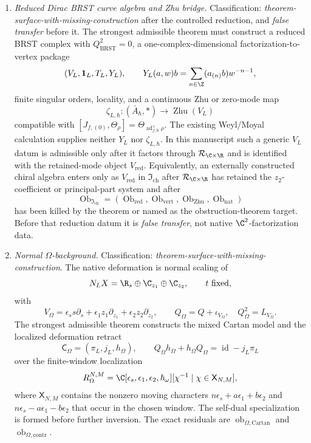 \begin{enumerate}
  \item \emph{Reduced Dirac BRST curve algebra and Zhu bridge.}
  Classification: \emph{theorem-surface-with-missing-construction} after
  the controlled reduction, and \emph{false transfer} before it.  The
  strongest admissible theorem must construct a reduced BRST complex
  with \(Q_{\mathrm{BRST}}^2=0\), a one-complex-dimensional
  factorization-to-vertex package
  \[
    (V_L,\mathbf 1_L,T_L,Y_L),
    \qquad
    Y_L(a,w)b=\sum_{n\in\Z}(a_{(n)}b)w^{-n-1},
  \]
  finite singular orders, locality, and a continuous Zhu or zero-mode map
  \[
    \zeta_{L,\hbar}\colon(\bar A_\hbar,*)\to\operatorname{Zhu}(V_L)
  \]
  compatible with
  \([J_{f,(0)},\Theta_\rho]
  =\Theta_{\operatorname{ad}^{\vee}_{f,\hbar}\rho}\).  The existing
  Weyl/Moyal calculation supplies neither \(Y_L\) nor \(\zeta_{L,\hbar}\).
  In this manuscript such a generic \(V_L\) datum is admissible only after
  it factors through \(\mathcal R_{\C\times\R}\) and is identified with
  the retained-mode object \(V_{\mathrm{red}}\).
  Equivalently, an externally constructed chiral algebra enters only as
  \(V_{\mathrm{red}}\) in
  \(\mathfrak I_{\mathrm{ch}}\) after
  \(\mathcal R_{\C\times\R}\) has retained the \(z_2\)-coefficient or
  principal-part system and after
  \[
    \operatorname{Ob}_{\mathfrak I_{\mathrm{ch}}}
    =
    (\operatorname{Ob}_{\mathrm{red}},
     \operatorname{Ob}_{\mathrm{vert}},
     \operatorname{Ob}_{\mathrm{Zhu}},
     \operatorname{Ob}_{\mathrm{nat}})
  \]
  has been killed by the theorem or named as the obstruction-theorem
  target.  Before that reduction datum it is \emph{false transfer}, not
  native \(\C^2\)-factorization data.

  \item \emph{Normal \(\Omega\)-background.}
  Classification: \emph{theorem-surface-with-missing-construction}.
  The native deformation is normal scaling of
  \[
    N_LX=\R_s\oplus\C_{z_1}\oplus\C_{z_2},
    \qquad t\ \text{fixed},
  \]
  with
  \[
    V_\Omega=\epsilon_s s\partial_s+
    \epsilon_1z_1\partial_{z_1}+\epsilon_2z_2\partial_{z_2},
    \qquad
    Q_\Omega=Q+\iota_{V_\Omega},\quad
    Q_\Omega^2=L_{V_\Omega}.
  \]
  The strongest admissible theorem constructs the mixed Cartan model and
  the localized deformation retract
  \[
    \mathsf C_\Omega=(\pi_L,j_L,h_\Omega),\qquad
    Q_\Omega h_\Omega+h_\Omega Q_\Omega=\operatorname{id}-j_L\pi_L
  \]
  over the finite-window localization
  \[
    R_\Omega^{N,M}
    =
    \C[\epsilon_s,\epsilon_1,\epsilon_2,\hbar_\omega]
    [\chi^{-1}\mid\chi\in\mathsf X_{N,M}],
  \]
  where \(\mathsf X_{N,M}\) contains the nonzero moving characters
  \(n\epsilon_s+a\epsilon_1+b\epsilon_2\) and
  \(n\epsilon_s-a\epsilon_1-b\epsilon_2\) that occur in the chosen
  window.  The self-dual specialization is formed before further
  inversion.  The exact residuals are
  \(\operatorname{ob}_{\Omega,\mathrm{Cartan}}\) and
  \(\operatorname{ob}_{\Omega,\mathrm{contr}}\).


\end{enumerate}
